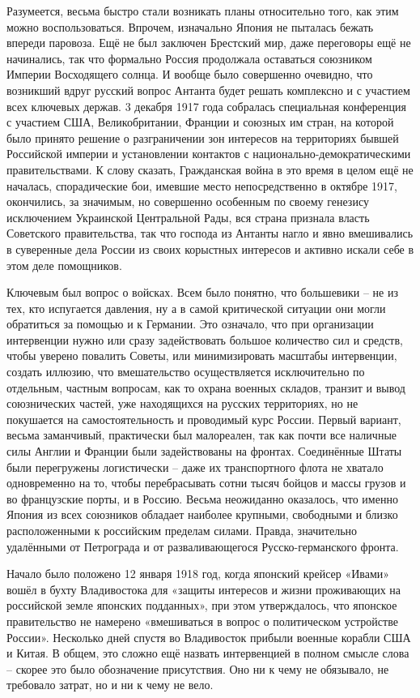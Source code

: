 Разумеется, весьма быстро стали возникать планы относительно того, как этим можно воспользоваться. Впрочем, изначально Япония не пыталась бежать впереди паровоза. Ещё не был заключен Брестский мир, даже переговоры ещё не начинались, так что формально Россия продолжала оставаться союзником Империи Восходящего солнца. И вообще было совершенно очевидно, что возникший вдруг русский вопрос Антанта будет решать комплексно и с участием всех ключевых держав. 3 декабря 1917 года собралась специальная конференция с участием США, Великобритании, Франции и союзных им стран, на которой было принято решение о разграничении зон интересов на территориях бывшей Российской империи и установлении контактов с национально-демократическими правительствами. К слову сказать, Гражданская война в это время в целом ещё не началась, спорадические бои, имевшие место непосредственно в октябре 1917, окончились, за значимым, но совершенно особенным по своему генезису исключением Украинской Центральной Рады, вся страна признала власть Советского правительства, так что господа из Антанты нагло и явно вмешивались в суверенные дела России из своих корыстных интересов и активно искали себе в этом деле помощников.

Ключевым был вопрос о войсках. Всем было понятно, что большевики – не из тех, кто испугается давления, ну а в самой критической ситуации они могли обратиться за помощью и к Германии. Это означало, что при организации интервенции нужно или сразу задействовать большое количество сил и средств, чтобы уверено повалить Советы, или минимизировать масштабы интервенции, создать иллюзию, что вмешательство осуществляется исключительно по отдельным, частным вопросам, как то охрана военных складов, транзит и вывод союзнических частей, уже находящихся на русских территориях, но не покушается на самостоятельность и проводимый курс России. Первый вариант, весьма заманчивый, практически был малореален, так как почти все наличные силы Англии и Франции были задействованы на фронтах. Соединённые Штаты были перегружены логистически – даже их транспортного флота не хватало одновременно на то, чтобы перебрасывать сотни тысяч бойцов и массы грузов и во французские порты, и в Россию. Весьма неожиданно оказалось, что именно Япония из всех союзников обладает наиболее крупными, свободными и близко расположенными к российским пределам силами. Правда, значительно удалёнными от Петрограда и от разваливающегося Русско-германского фронта.

Начало было положено 12 января 1918 год, когда японский крейсер «Ивами» вошёл в бухту Владивостока для «защиты интересов и жизни проживающих на российской земле японских подданных», при этом утверждалось, что японское правительство не намерено «вмешиваться в вопрос о политическом устройстве России». Несколько дней спустя во Владивосток прибыли военные корабли США и Китая. В общем, это сложно ещё назвать интервенцией в полном смысле слова – скорее это было обозначение присутствия. Оно ни к чему не обязывало, не требовало затрат, но и ни к чему не вело.

